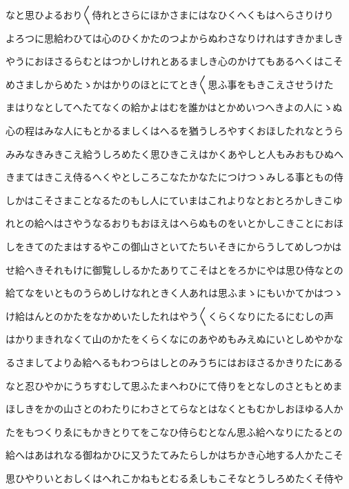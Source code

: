 \documentclass[a4paper,11pt,landscape]{ltjtarticle}
\begin{document}
\par\medskip
なと思ひよるおり〱侍れとさらにほかさまにはなひくへくもはへらさりけり
\par\medskip
よろつに思給わひては心のひくかたのつよからぬわさなりけれはすきかましき
\par\medskip
やうにおほさるらむとはつかしけれとあるましき心のかけてもあるへくはこそ
\par\medskip
めさましからめたゝかはかりのほとにてとき〱思ふ事をもきこえさせうけた
\par\medskip
まはりなとしてへたてなくの給かよはむを誰かはとかめいつへきよの人にゝぬ
\par\medskip
心の程はみな人にもとかるましくはへるを猶うしろやすくおほしたれなとうら
\par\medskip
みみなきみきこえ給うしろめたく思ひきこえはかくあやしと人もみおもひぬへ
\par\medskip
きまてはきこえ侍るへくやとしころこなたかなたにつけつゝみしる事ともの侍
\par\medskip
しかはこそさまことなるたのもし人にていまはこれよりなとおとろかしきこゆ
\par\medskip
れとの給へはさやうなるおりもおほえはへらぬものをいとかしこきことにおほ
\par\medskip
しをきてのたまはするやこの御山さといてたちいそきにからうしてめしつかは
\par\medskip
せ給へきそれもけに御覧ししるかたありてこそはとをろかにやは思ひ侍なとの
\par\medskip
給てなをいとものうらめしけなれときく人あれは思ふまゝにもいかてかはつゝ
\par\medskip
け給はんとのかたをなかめいたしたれはやう〱くらくなりにたるにむしの声
\par\medskip
はかりまきれなくて山のかたをくらくなにのあやめもみえぬにいとしめやかな
\par\medskip
るさましてよりゐ給へるもわつらはしとのみうちにはおほさるかきりたにある
\par\medskip
なと忍ひやかにうちすむして思ふたまへわひにて侍りをとなしのさともとめま
\par\medskip
ほしきをかの山さとのわたりにわさとてらなとはなくともむかしおほゆる人か
\par\medskip
たをもつくりゑにもかきとりてをこなひ侍らむとなん思ふ給へなりにたるとの
\par\medskip
給へはあはれなる御ねかひに又うたてみたらしかはちかき心地する人かたこそ
\par\medskip
思ひやりいとおしくはへれこかねもとむるゑしもこそなとうしろめたくそ侍や
\par\medskip
\end{document}
